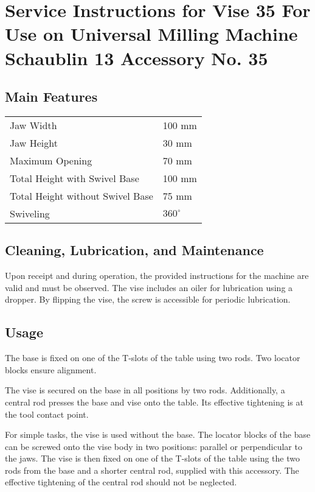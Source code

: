 \chapter{Service Instructions for Vise 35 For Use on Universal Milling Machine Schaublin 13 \small{Accessory No. 35}}

\section*{Main Features}


\begin{tabular}{@{}ll@{}}
    Jaw Width                        & 100 mm        \\
    Jaw Height                       & 30 mm         \\
    Maximum Opening                  & 70 mm         \\
    Total Height with Swivel Base    & 100 mm        \\
    Total Height without Swivel Base & 75 mm         \\
    Swiveling                        & \(360^\circ\)
\end{tabular}

\section*{Cleaning, Lubrication, and Maintenance}

Upon receipt and during operation, the provided instructions for the machine are valid and must be observed.
The vise includes an oiler for lubrication using a dropper.
By flipping the vise, the screw is accessible for periodic lubrication.

\section*{Usage}

The base is fixed on one of the T-slots of the table using two rods. Two locator blocks ensure alignment.

The vise is secured on the base in all positions by two rods.
Additionally, a central rod presses the base and vise onto the table.
Its effective tightening is at the tool contact point.

For simple tasks, the vise is used without the base.
The locator blocks of the base can be screwed onto the vise body in two positions: parallel or perpendicular to the jaws.
The vise is then fixed on one of the T-slots of the table using the two rods from the base and a shorter central rod,
supplied with this accessory. The effective tightening of the central rod should not be neglected.
